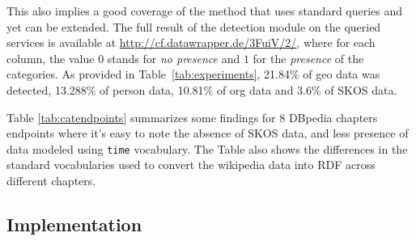 This also implies a good coverage of the method that uses standard queries and yet can be extended. The full result of the detection module on the queried services is available at \url{http://cf.datawrapper.de/3FuiV/2/}, where for each column, the value $0$ stands for \textit{no presence} and $1$ for the \textit{presence} of the categories. As provided in Table~\ref{tab:experiments}, 21.84\% of geo data was detected, 13.288\% of person data, 10.81\% of org data and 3.6\% of SKOS data.
 
\begin{table}[!htbp]
\end{table}

Table \ref{tab:catendpoints} summarizes some findings for $8$ DBpedia chapters endpoints where it's easy to note the absence of SKOS data, and less presence of data modeled using \texttt{time} vocabulary. The Table also shows the differences in the standard vocabularies used to convert the wikipedia data into RDF across different chapters. 


\subsection{Implementation}
 \\
 \\

